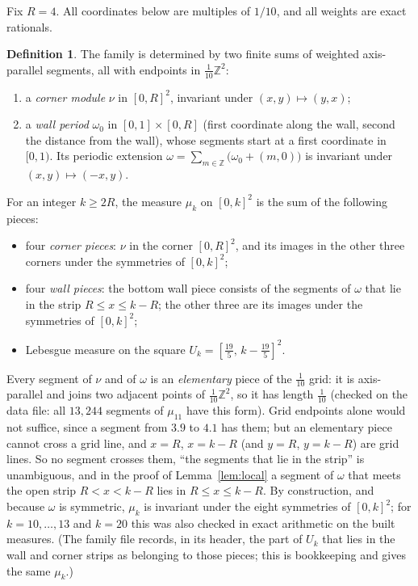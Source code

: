 \documentclass[11pt]{amsart}
\theoremstyle{definition}
\newtheorem{definition}[theorem]{Definition}
\theoremstyle{remark}
\newcommand{\Z}{\mathbb Z}
\begin{document}
Fix $R=4$. All coordinates below are multiples of $1/10$, and all weights are exact rationals.

\begin{definition}\label{def:family}
The family is determined by two finite sums of weighted axis-parallel segments, all with endpoints in
$\frac1{10}\Z^2$:
\begin{enumerate}
\item a \emph{corner module} $\nu$ in $[0,R]^2$, invariant under $(x,y)\mapsto(y,x)$;
\item a \emph{wall period} $\omega_0$ in $[0,1]\times[0,R]$ (first coordinate along the wall, second the distance from
the wall), whose segments start at a first coordinate in $[0,1)$. Its periodic extension
$\omega=\sum_{m\in\Z}\bigl(\omega_0+(m,0)\bigr)$ is invariant under $(x,y)\mapsto(-x,y)$.
\end{enumerate}
For an integer $k\ge2R$, the measure $\mu_k$ on $[0,k]^2$ is the sum of the following pieces:
\begin{itemize}
\item four \emph{corner pieces}: $\nu$ in the corner $[0,R]^2$, and its images in the other three corners under the
symmetries of $[0,k]^2$;
\item four \emph{wall pieces}: the bottom wall piece consists of the segments of $\omega$ that lie in the strip
$R\le x\le k-R$; the other three are its images under the symmetries of $[0,k]^2$;
\item Lebesgue measure on the square $U_k=[\tfrac{19}5,\,k-\tfrac{19}5]^2$.
\end{itemize}
\end{definition}

Every segment of $\nu$ and of $\omega$ is an \emph{elementary} piece of the $\frac1{10}$ grid: it is axis-parallel and
joins two adjacent points of $\frac1{10}\Z^2$, so it has length $\frac1{10}$ (checked on the data file: all $13{,}244$
segments of $\mu_{11}$ have this form). Grid endpoints alone would not suffice, since a segment from $3.9$ to $4.1$ has
them; but an elementary piece cannot cross a grid line, and $x=R$, $x=k-R$ (and $y=R$, $y=k-R$) are grid lines. So
no segment crosses them, ``the segments that lie in the strip'' is unambiguous, and in the proof of
Lemma~\ref{lem:local} a segment of $\omega$ that meets the open strip $R<x<k-R$ lies in $R\le x\le k-R$. By construction, and because $\omega$
is symmetric, $\mu_k$ is invariant under the eight symmetries of $[0,k]^2$; for $k=10,\dots,13$ and $k=20$ this was
also checked in exact arithmetic on the built measures. (The family file records, in its header, the part of $U_k$
that lies in the wall and corner strips as belonging to those pieces; this is bookkeeping and gives the same
$\mu_k$.)
\end{document}
